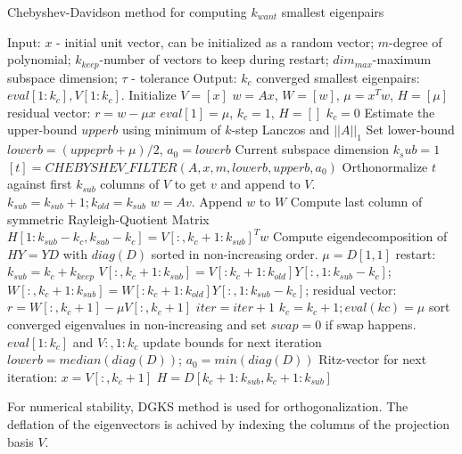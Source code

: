 \documentclass[10pt,a4paper, nocenter]{article}
\newcommand{\norm}[1]{\lvert\lvert {#1} \rvert\rvert}
\begin{document}
    \begin{algorithm}
	\label{alg:chebyshev_davidson}
	\caption{Chebyshev-Davidson method for computing $k_{want}$ smallest eigenpairs}
	\begin{algorithmic}[1]
		\State Input: $x$ - initial unit vector, can be initialized as a random vector; $m$-degree of polynomial; $k_{keep}$-number of vectors to keep during restart; $dim_{max}$-maximum subspace dimension; $\tau$ - tolerance
		\State Output: $k_c$ converged smallest eigenpairs: $eval[1:k_c], V[1:k_c]$. 
		\State Initialize $V = [x]$
		\State $w = Ax$, $W=[w]$, $\mu = x^Tw$,  $H=[\mu]$
		\State residual vector: $r = w-\mu x$
		\If{$\norm{r} \le \tau$}
			\State $eval[1] = \mu$, $k_c = 1$, $H=[]$ 
		\Else 
			\State $k_c=0$
		\EndIf
		\State Estimate the upper-bound $upperb$ using minimum of $k$-step Lanczos and $\norm{A}_1$
		\State Set lower-bound $lowerb = (uppeprb+\mu)/2$, $a_0=lowerb$
		\State Current subspace dimension $k_sub = 1$
		\State $[t] = CHEBYSHEV\_FILTER(A,x,m,lowerb, upperb, a_0)$
		\State Orthonormalize $t$ against first $k_{sub}$ columns of $V$ to get $v$ and append to $V$. $k_{sub} = k_{sub}+1; k_{old} = k_{sub}$
		\State $w=Av$. Append $w$ to $W$
		\State Compute last column of symmetric Rayleigh-Quotient Matrix $H[1:k_{sub}-k_c,k_{sub}-k_c] = V[:,k_c+1:k_{sub}]^Tw$
		\State Compute eigendecomposition of $HY = YD$ with $diag(D)$ sorted in non-increasing order. $\mu = D[1,1]$
		\State restart: $k_{sub} = k_c+k_{keep}$
		\EndIf
		\State  $V[:,k_c+1:k_{sub}] = V[:k_c+1:k_{old}]Y[:,1:k_{sub}-k_c]$; $W[:,k_c+1:k_{sub}] = W[:k_c+1:k_{old}]Y[:,1:k_{sub}-k_c]$;
		\State residual vector: $r = W[:,k_c+1] - \mu V[:,k_c+1]$
		\State $iter = iter + 1$
		\If{$\norm{r} \le \tau max(diag(D))$}
		\State $k_c = k_c+1; eval(kc) = \mu$
		\State sort converged eigenvalues in non-increasing and set $swap=0$ if swap happens.
		\EndIf
		\State \Return $eval[1:k_c]$ and $V{:,1:k_c}$
		\EndIf
		\State update bounds for next iteration $lowerb = median(diag(D))$; 
		\State $a_0 = min(diag(D)) $
		\EndIf
		\State Ritz-vector for next iteration: $x = V[:,k_c+1]$
		\State $H = D[k_c+1:k_{sub}, k_c+1:k_{sub}]$
		\EndWhile
		\State {}
	\end{algorithmic}
	\end{algorithm}
	
	For numerical stability, DGKS method is used for orthogonalization. The deflation of the eigenvectors is achived by indexing the columns of the projection basis $V$.
	
\end{document}
